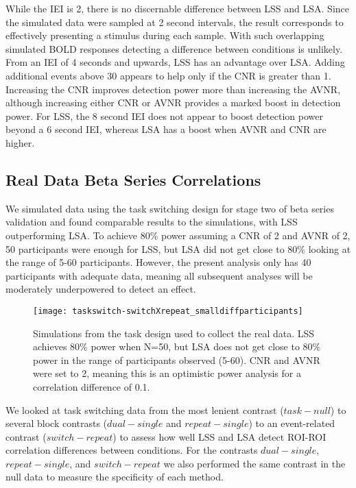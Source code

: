 \documentclass[10pt,letterpaper]{article}
\begin{document}
While the IEI is 2, there is no discernable difference between LSS and LSA.
Since the simulated data were sampled at 2 second intervals, the result
corresponds to effectively presenting a stimulus during each sample.
With such overlapping simulated BOLD responses detecting a difference between conditions
is unlikely.
From an IEI of 4 seconds and upwards, LSS has an advantage over LSA.
Adding additional events above 30 appears to help only if the CNR is greater than 1.
Increasing the CNR improves detection power more than increasing the AVNR, although increasing either
CNR or AVNR provides a marked boost in detection power.
For LSS, the 8 second IEI does not appear to boost detection power beyond a 6 second IEI,
whereas LSA has a boost when AVNR and CNR are higher.


\subsection*{Real Data Beta Series Correlations}
\label{results:bsc-taskswitch}

We simulated data using the task switching design for stage two of beta series
validation and found comparable
results to the simulations, with LSS outperforming LSA.
To achieve 80\% power assuming a CNR of 2 and AVNR of 2, 50 participants were enough for LSS, but LSA
did not get close to 80\% looking at the range of 5-60 participants.
However, the present analysis only has 40 participants with adequate data, meaning
all subsequent analyses will be moderately underpowered to detect an effect.

\begin{figure}[H]
  \texttt{[image: taskswitch-switchXrepeat\_smalldiffparticipants]}
  \caption{
    Simulations from the task design used to collect the real data.
    LSS achieves 80\% power when N=50, but LSA does not get close to 80\%
    power in the range of participants observed (5-60).
    CNR and AVNR were set to 2, meaning this is an optimistic power analysis
    for a correlation difference of 0.1.
  }
  \label{fig:taskswitch-simulation}
\end{figure}

We looked at task switching data from the most lenient
contrast ($task - null$) to several block contrasts ($dual - single$ and $repeat - single$)
to an event-related contrast ($switch - repeat$)
to assess how well LSS and LSA detect ROI-ROI correlation differences between conditions.
For the contrasts $dual - single$, $repeat - single$, and $switch - repeat$ we also
performed the same contrast in the null data to measure the specificity of each method.
\end{document}
